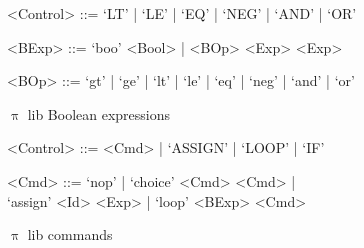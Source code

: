\documentclass[a4paper,openany]{book}
\begin{document}
%
%
\begin{Grammar}
\begin{grammar}
<Control> ::=  `LT' | `LE' | `EQ' | `NEG' | `AND' | `OR'  

<BExp> ::= `boo' <Bool> | <BOp> <Exp> <Exp>

<BOp> ::= `gt' | `ge' | `lt' | `le' | `eq' | `neg' | `and' | `or' 
\end{grammar}
\caption{$\uppi$ lib Boolean expressions}
\label{grm:uppi-lib-bexp}
\end{Grammar}

%    
%    
%

\begin{Grammar}
\begin{grammar}
<Control> ::= <Cmd> | `ASSIGN' | `LOOP' | `IF'

<Cmd> ::= `nop' | `choice' <Cmd> <Cmd> | \\
`assign' <Id> <Exp> | `loop' <BExp> <Cmd>
\end{grammar}
\caption{$\uppi$ lib commands}
\label{grm:uppi-lib-cmd}
\end{Grammar}

%
%    
%    
\end{document}
